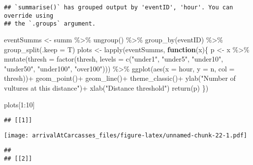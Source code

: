 \documentclass[
]{article}
\newenvironment{Shaded}{\begin{snugshade}}{\end{snugshade}}
\newcommand{\AttributeTok}[1]{\textcolor[rgb]{0.77,0.63,0.00}{#1}}
\newcommand{\ControlFlowTok}[1]{\textcolor[rgb]{0.13,0.29,0.53}{\textbf{#1}}}
\newcommand{\DecValTok}[1]{\textcolor[rgb]{0.00,0.00,0.81}{#1}}
\newcommand{\FunctionTok}[1]{\textcolor[rgb]{0.00,0.00,0.00}{#1}}
\newcommand{\NormalTok}[1]{#1}
\newcommand{\OtherTok}[1]{\textcolor[rgb]{0.56,0.35,0.01}{#1}}
\newcommand{\SpecialCharTok}[1]{\textcolor[rgb]{0.00,0.00,0.00}{#1}}
\newcommand{\StringTok}[1]{\textcolor[rgb]{0.31,0.60,0.02}{#1}}
\begin{document}
\begin{verbatim}
## `summarise()` has grouped output by 'eventID', 'hour'. You can override using
## the `.groups` argument.
\end{verbatim}

\begin{Shaded}
\begin{Highlighting}[]
\NormalTok{eventSumms }\OtherTok{\textless{}{-}}\NormalTok{ summ }\SpecialCharTok{\%\textgreater{}\%}
  \FunctionTok{ungroup}\NormalTok{() }\SpecialCharTok{\%\textgreater{}\%}
  \FunctionTok{group\_by}\NormalTok{(eventID) }\SpecialCharTok{\%\textgreater{}\%}
  \FunctionTok{group\_split}\NormalTok{(}\AttributeTok{.keep =}\NormalTok{ T)}
\NormalTok{plots }\OtherTok{\textless{}{-}} \FunctionTok{lapply}\NormalTok{(eventSumms, }\ControlFlowTok{function}\NormalTok{(x)\{}
\NormalTok{  p }\OtherTok{\textless{}{-}}\NormalTok{ x }\SpecialCharTok{\%\textgreater{}\%}
    \FunctionTok{mutate}\NormalTok{(}\AttributeTok{thresh =} \FunctionTok{factor}\NormalTok{(thresh, }\AttributeTok{levels =} \FunctionTok{c}\NormalTok{(}\StringTok{"under1"}\NormalTok{, }\StringTok{"under5"}\NormalTok{, }\StringTok{"under10"}\NormalTok{, }\StringTok{"under50"}\NormalTok{, }\StringTok{"under100"}\NormalTok{, }\StringTok{"over100"}\NormalTok{))) }\SpecialCharTok{\%\textgreater{}\%}
    \FunctionTok{ggplot}\NormalTok{(}\FunctionTok{aes}\NormalTok{(}\AttributeTok{x =}\NormalTok{ hour, }\AttributeTok{y =}\NormalTok{ n, }\AttributeTok{col =}\NormalTok{ thresh))}\SpecialCharTok{+}
    \FunctionTok{geom\_point}\NormalTok{()}\SpecialCharTok{+}
    \FunctionTok{geom\_line}\NormalTok{()}\SpecialCharTok{+}
    \FunctionTok{theme\_classic}\NormalTok{()}\SpecialCharTok{+}
    \FunctionTok{ylab}\NormalTok{(}\StringTok{"Number of vultures at this distance"}\NormalTok{)}\SpecialCharTok{+}
    \FunctionTok{xlab}\NormalTok{(}\StringTok{"Distance threshold"}\NormalTok{)}
  \FunctionTok{return}\NormalTok{(p)}
\NormalTok{\})}

\NormalTok{plots[}\DecValTok{1}\SpecialCharTok{:}\DecValTok{10}\NormalTok{]}
\end{Highlighting}
\end{Shaded}

\begin{verbatim}
## [[1]]
\end{verbatim}

\texttt{[image: arrivalAtCarcasses\_files/figure-latex/unnamed-chunk-22-1.pdf]}

\begin{verbatim}
## 
## [[2]]
\end{verbatim}
\end{document}
